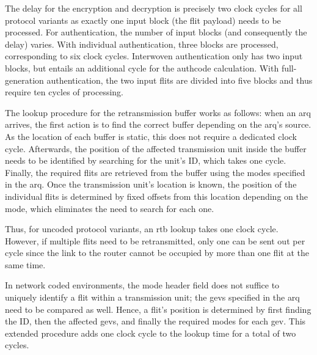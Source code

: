 The delay for the encryption and decryption is precisely two clock cycles for all protocol variants as exactly one input block (the flit payload)
needs to be processed. For authentication, the number of input blocks (and consequently the delay) varies. With individual authentication, three
blocks are processed, corresponding to six clock cycles. Interwoven authentication only has two input blocks, but entails an additional cycle for the
authcode calculation. With full-generation authentication, the two input flits are divided into five blocks and thus require ten cycles of
processing.

The lookup procedure for the retransmission buffer works as follows: when an \gls{arq} arrives, the first action is to find the correct buffer
depending on the \gls{arq}'s source. As the location of each buffer is static, this does not require a dedicated clock cycle. Afterwards, the position
of the affected transmission unit inside the buffer needs to be identified by searching for the unit's ID, which takes one cycle. Finally, the
required flits are retrieved from the buffer using the modes specified in the \gls{arq}. Once the transmission unit's location is known, the position
of the individual flits is determined by fixed offsets from this location depending on the mode, which eliminates the need to search for each one.

Thus, for uncoded protocol variants, an \gls{rtb} lookup takes one clock cycle. However, if multiple flits need to be retransmitted, only one can be
sent out per cycle since the link to the router cannot be occupied by more than one flit at the same time.

In network coded environments, the mode header field does not suffice to uniquely identify a flit within a transmission unit; the \glspl{gev}
specified in the \gls{arq} need to be compared as well. Hence, a flit's position is determined by first finding the ID, then the affected \glspl{gev},
and finally the required modes for each \gls{gev}. This extended procedure adds one clock cycle to the lookup time for a total of two cycles.
